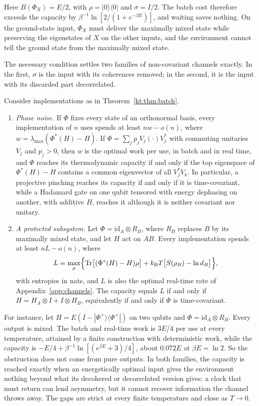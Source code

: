 Here $B(\Phi_X)=E/2$, with $\rho=|0\rangle\langle0|$ and $\sigma=I/2$. The batch cost therefore exceeds the capacity by $\beta^{-1}\ln[2/(1+e^{-\beta E})]$, and waiting saves nothing. On the ground-state input, $\Phi_X$ must deliver the maximally mixed state while preserving the eigenstates of $X$ on the other inputs, and the environment cannot tell the ground state from the maximally mixed state.

The necessary condition settles two families of non-covariant channels exactly. In the first, $\sigma$ is the input with its coherences removed; in the second, it is the input with its discarded part decorrelated.

\begin{proposition}\label{kt:prop:families}
Consider implementations as in Theorem~\ref{kt:thm:batch}.
\begin{enumerate}[label=(\alph*)]
\item \emph{Phase noise.} If $\Phi$ fixes every state of an orthonormal basis, every implementation of $n$ uses spends at least $nw-o(n)$, where $w=\lambda_{\max}(\Phi^*(H)-H)$. If $\Phi=\sum_jp_jV_j(\cdot)V_j^*$ with commuting unitaries $V_j$ and $p_j>0$, then $w$ is the optimal work per use, in batch and in real time, and $\Phi$ reaches its thermodynamic capacity if and only if the top eigenspace of $\Phi^*(H)-H$ contains a common eigenvector of all $V_j^*V_k$. In particular, a projective pinching reaches its capacity if and only if it is time-covariant, while a Hadamard gate on one qubit tensored with energy dephasing on another, with additive $H$, reaches it although it is neither covariant nor unitary.
\item \emph{A protected subsystem.} Let $\Phi=\mathrm{id}_A\otimes R_B$, where $R_B$ replaces $B$ by its maximally mixed state, and let $H$ act on $AB$. Every implementation spends at least $nL-o(n)$, where
\[
L=\max_\rho\Bigl\{\operatorname{Tr}\bigl[(\Phi^*(H)-H)\rho\bigr]+k_{\mathrm B} T\bigl[S(\rho_B)-\ln d_B\bigr]\Bigr\},
\]
with entropies in nats, and $L$ is also the optimal real-time rate of Appendix~\ref{app:channels}. The capacity equals $L$ if and only if $H=H_A\otimes I+I\otimes H_B$, equivalently if and only if $\Phi$ is time-covariant.
\end{enumerate}
\end{proposition}

For instance, let $H=E(I-|\Phi^+\rangle\langle\Phi^+|)$ on two qubits and $\Phi=\mathrm{id}_A\otimes R_B$. Every output is mixed. The batch and real-time work is $3E/4$ per use at every temperature, attained by a finite construction with deterministic work, while the capacity is $-E/4+\beta^{-1}\ln[(e^{\beta E}+3)/4]$, about $0.072E$ at $\beta E=\ln2$. So the obstruction does not come from pure outputs. In both families, the capacity is reached exactly when an energetically optimal input gives the environment nothing beyond what its decohered or decorrelated version gives: a clock that must return can lend asymmetry, but it cannot recover information the channel throws away. The gaps are strict at every finite temperature and close as $T\to0$.

